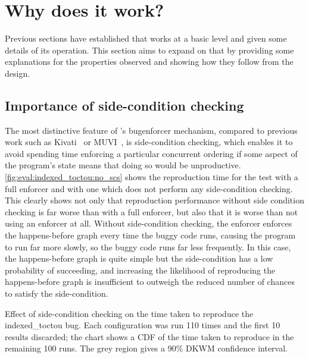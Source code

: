 \section{Why does it work?}
\label{sect:eval:why_does_it_work}

Previous sections have established that {\technique} works at a basic
level and given some details of its operation.  This section aims to
expand on that by providing some explanations for the properties
observed and showing how they follow from the {\technique} design.

\subsection{Importance of side-condition checking}

The most distinctive feature of {\technique}'s \gls{bugenforcer}
mechanism, compared to previous work such as Kivati~\cite{Chew2010} or
MUVI~\cite{Lu2007}, is side-condition checking, which enables it to
avoid spending time enforcing a particular concurrent ordering if some
aspect of the program's state means that doing so would be
unproductive.  \autoref{fig:eval:indexed_toctou:no_scs} shows the
reproduction time for the  test with a full enforcer
and with one which does not perform any side-condition checking.  This
clearly shows not only that reproduction performance without side
condition checking is far worse than with a full enforcer, but also
that it is worse than not using an enforcer at all.  Without
side-condition checking, the enforcer enforces the happens-before
graph every time the buggy code runs, causing the program to run far
more slowly, so the buggy code runs far less frequently.  In this
case, the happens-before graph is quite simple but the side-condition
has a low probability of succeeding, and increasing the likelihood of
reproducing the happens-before graph is insufficient to outweigh the
reduced number of chances to satisfy the
side-condition.

\begin{sanefig}
  \caption{Effect of side-condition checking on the time taken to
    reproduce the indexed\_toctou bug.  Each configuration was run 110 times
    and the first 10 results discarded; the chart shows a CDF of the time taken
    to reproduce in the remaining 100 runs.  The grey region gives a 90\%
    DKWM confidence interval.}
  \label{fig:eval:indexed_toctou:no_scs}
\end{sanefig}

